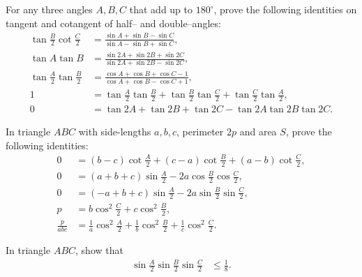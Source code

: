 \begin{question}
        For any three angles $A,B,C$ that add up to $180^\circ$, prove the following identities on tangent and cotangent of half-- and double--angles:
        \begin{align*}
            \tan \frac{B}{2} \cot \frac{C}{2} &= \frac{\sin A + \sin B - \sin C}{\sin A - \sin B + \sin C},\\
            \tan A \tan B &= \frac{\sin 2A + \sin 2B + \sin 2C}{\sin 2A + \sin 2B - \sin 2C},\\
            \tan\frac{A}{2}\tan\frac{B}{2} &= \frac{\cos A + \cos B + \cos C - 1}{\cos A + \cos B - \cos C + 1},\\
            1 &= \tan\frac{A}{2}\tan\frac{B}{2}+\tan\frac{B}{2}\tan\frac{C}{2}+\tan\frac{C}{2}\tan\frac{A}{2},\\
            0 &= \tan 2A + \tan 2B + \tan 2C - \tan 2A \tan 2B \tan 2C.
        \end{align*}
\end{question}

\begin{question}
    In triangle $ABC$ with side-lengths $a,b,c$, perimeter $2p$ and area $S$, prove the following identities:
    \begin{align*}
        0 &= (b-c)\cot\frac{A}{2}+(c-a)\cot\frac{B}{2}+(a-b)\cot\frac{C}{2},\\
        0 &= (a+b+c)\sin\frac{A}{2} - 2 a \cos\frac{B}{2}\cos\frac{C}{2},\\
        0 &= (-a+b+c)\sin\frac{A}{2} - 2 a \sin\frac{B}{2}\sin\frac{C}{2},\\
        p &= b\cos^2 \frac{C}{2} + c\cos^2 \frac{B}{2},\\
        \frac{p}{abc} &= \frac{1}{a}\cos^2\frac{A}{2}+\frac{1}{b}\cos^2\frac{B}{2}+\frac{1}{c}\cos^2\frac{C}{2}.
    \end{align*}
\end{question}


\begin{question}
In triangle $ABC$, show that
    \begin{align}
        \sin{\frac{A}{2}}\sin{\frac{B}{2}}\sin{\frac{C}{2}} &\le \frac{1}{8}.\label{Q2}
    \end{align}
\end{question}

